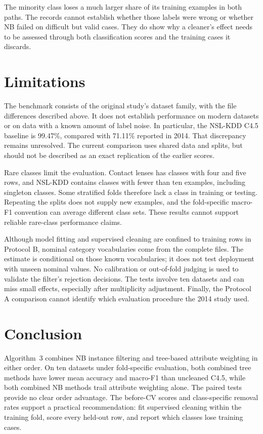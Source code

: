 \documentclass[conference]{IEEEtran}
\begin{document}
The minority class loses a much larger share of its training examples in
both paths. The records cannot establish whether those labels were wrong
or whether NB failed on difficult but valid cases. They do show why a
cleaner's effect needs to be assessed through both classification scores
and the training cases it discards.

\section{Limitations}
The benchmark consists of the original study's dataset family, with the
file differences described above. It does not establish performance on
modern datasets or on data with a known amount of label noise. In
particular, the NSL-KDD C4.5 baseline is 99.47\%, compared with 71.11\%
reported in 2014. That discrepancy remains unresolved. The current
comparison uses shared data and splits, but should not be described as an
exact replication of the earlier scores.

Rare classes limit the evaluation. Contact lenses has classes with four
and five rows, and NSL-KDD contains classes with fewer than ten examples,
including singleton classes. Some stratified folds therefore lack a class
in training or testing. Repeating the splits does not supply new examples,
and the fold-specific macro-F1 convention can average different class
sets. These results cannot support reliable rare-class performance claims.

Although model fitting and supervised cleaning are confined to training
rows in Protocol B, nominal category vocabularies come from the complete
files. The estimate is conditional on those known vocabularies; it does
not test deployment with unseen nominal values. No calibration or
out-of-fold judging is used to validate the filter's rejection decisions.
The tests involve ten datasets and can miss small effects, especially
after multiplicity adjustment. Finally, the Protocol A comparison cannot
identify which evaluation procedure the 2014 study used.

\section{Conclusion}
Algorithm~3 combines NB instance filtering and tree-based attribute
weighting in either order. On ten datasets under fold-specific evaluation,
both combined tree methods have lower mean accuracy and macro-F1 than
uncleaned C4.5, while both combined NB methods trail attribute weighting
alone. The paired tests provide no clear order advantage. The before-CV
scores and class-specific removal rates support a practical recommendation:
fit supervised cleaning within the training fold, score every held-out row,
and report which classes lose training cases.



\end{document}
